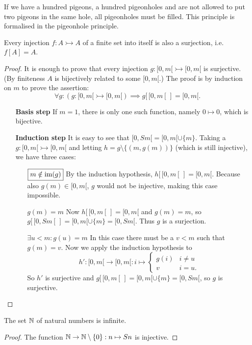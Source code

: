 If we have a hundred pigeons, a hundred pigeonholes and are not allowed to put two pigeons in the same hole, all pigeonholes must be filled. This principle is formalised in the pigeonhole principle.
\begin{theorem}
Every injection $f:A\rightarrowtail A$ of a finite set into itself is also a surjection, i.e. $f[A] = A$.
\end{theorem}
\begin{proof}
It is enough to prove that every injection $g: [0,m[ \rightarrowtail [0,m[$ is surjective. (By finiteness $A$ is bijectively related to some $[0,m[$.)
The proof is by induction on $m$ to prove the assertion:
\[ \forall g: \left(g: [0,m[ \rightarrowtail [0,m[\right) \implies g[\,[0,m[\,] = [0,m[. \]
\begin{itemize}[leftmargin=2.5cm]
\item[\textbf{Basis step}] If $m=1$, there is only one such function, namely $0\mapsto 0$, which is bijective.
\item[\textbf{Induction step}] It is easy to see that $[0,Sm[ = [0,m[\cup \{m\}$. Taking a $g: [0,m[ \rightarrowtail [0,m[$ and letting $h = g\setminus \{(m,g(m))\}$ (which is still injective), we have three cases:
\begin{itemize}[leftmargin=2cm]
\item[$\boxed{m\notin \operatorname{im}(g)}$] By the induction hypothesis, $h[\,[0,m[\,] = [0,m[$. Because also $g(m)\in [0,m[$, $g$ would not be injective, making this case impossible.
\item[$\boxed{g(m) = m}$] Now $h[\,[0,m[\,] = [0,m[$ and $g(m)=m$, so $g[\,[0,Sm[\,] = [0,m[\cup \{m\} = [0,Sm[$. Thus $g$ is a surjection.
\item[$\boxed{\exists u<m: g(u) = m}$] In this case there must be a $v<m$ such that $g(m) = v$. Now we apply the induction hypothesis to
\[ h': [0,m[ \to [0,m[: i\mapsto \begin{cases}
g(i) & i\neq u \\
v & i=u.
\end{cases} \]
So $h'$ is surjective and $g[\,[0,m[\,] = [0,m[\cup \{m\} = [0,Sm[$, so $g$ is surjective.
\end{itemize}
\end{itemize}
\end{proof}
\begin{corollary}
The set $\mathbb{N}$ of natural numbers is infinite.
\end{corollary}
\begin{proof}
The function $\mathbb{N}\to \mathbb{N}\setminus\{0\}: n\mapsto Sn$ is injective.
\end{proof}
